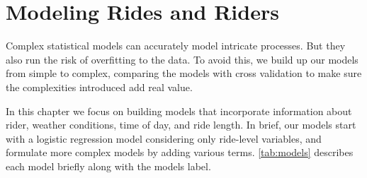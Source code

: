 \documentclass[]{article}
\title{}
\author{}
\date{}
\begin{document}
\maketitle

\section{Modeling Rides and Riders}\label{modeling-rides-and-riders}

Complex statistical models can accurately model intricate processes. But
they also run the risk of overfitting to the data. To avoid this, we
build up our models from simple to complex, comparing the models with
cross validation to make sure the complexities introduced add real
value.

In this chapter we focus on building models that incorporate information
about rider, weather conditions, time of day, and ride length. In brief,
our models start with a logistic regression model considering only
ride-level variables, and formulate more complex models by adding
various terms. \autoref{tab:models} describes each model briefly along
with the models label.
\end{document}
